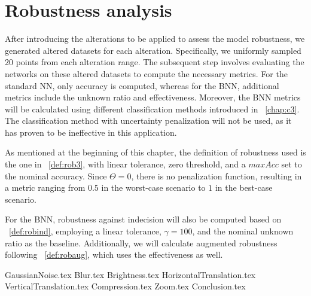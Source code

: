 \section{Robustness analysis}

After introducing the alterations to be applied to assess the model robustness, we generated altered datasets for each alteration. Specifically, we uniformly sampled 20 points from each alteration range. The subsequent step involves evaluating the networks on these altered datasets to compute the necessary metrics. For the standard NN, only accuracy is computed, whereas for the BNN, additional metrics include the unknown ratio and effectiveness. Moreover, the BNN metrics will be calculated using different classification methods introduced in \Chap~\ref{chap:c3}. The classification method with uncertainty penalization will not be used, as it has proven to be ineffective in this application.

As mentioned at the beginning of this chapter, the definition of robustness used is the one in \Def~\ref{def:rob3}, with linear tolerance, zero threshold, and a $maxAcc$ set to the nominal accuracy. Since $\Theta=0$, there is no penalization function, resulting in a metric ranging from $0.5$ in the worst-case scenario to $1$ in the best-case scenario.

For the BNN, robustness against indecision will also be computed based on \Def~\ref{def:robind}, employing a linear tolerance, $\gamma=100$, and the nominal unknown ratio as the baseline. Additionally, we will calculate augmented robustness following \Def~\ref{def:robaug}, which uses the effectiveness as well.

{GaussianNoise.tex}
{Blur.tex}
{Brightness.tex}
{HorizontalTranslation.tex}
{VerticalTranslation.tex}
{Compression.tex}
{Zoom.tex}
{Conclusion.tex}